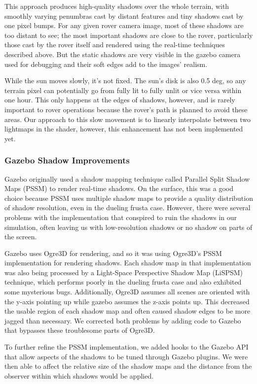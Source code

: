 \documentclass[twocolumn,letterpaper]{IEEEAerospaceCLS}  %
\begin{document}
This approach produces high-quality shadows over the whole terrain, with smoothly varying penumbras cast by distant features and tiny shadows cast by one pixel bumps.  For any given rover camera image, most of these shadows are too distant to see; the most important shadows are close to the rover, particularly those cast by the rover itself and rendered using the real-time techniques described above.  But the static shadows are very visible in the gazebo camera used for debugging and their soft edges add to the images' realism.

While the sun moves slowly, it's not fixed.  The sun's disk is also 0.5 deg, so any terrain pixel can potentially go from fully lit to fully unlit or vice versa within one hour.  This only happens at the edges of shadows, however, and is rarely important to rover operations because the rover's path is planned to avoid these areas.  Our approach to this slow movement is to linearly interpolate between two lightmaps in the shader, however, this enhancement has not been implemented yet.

\subsubsection{Gazebo Shadow Improvements}
Gazebo originally used a shadow mapping technique called Parallel Split Shadow Maps (PSSM) to render real-time shadows. On the surface, this was a good choice because PSSM uses multiple shadow maps to provide a quality distribution of shadow resolution, even in the dueling frusta case. However, there were several problems with the implementation that conspired to ruin the shadows in our simulation, often leaving us with low-resolution shadows or no shadow on parts of the screen.

Gazebo uses Ogre3D for rendering, and so it was using Ogre3D's PSSM implementation for rendering shadows. Each shadow map in that implementation was also being processed by a Light-Space Perspective Shadow Map (LiSPSM) technique, which performs poorly in the dueling frusta case and also exhibited some mysterious bugs. Additionally, Ogre3D assumes all scenes are oriented with the y-axis pointing up while gazebo assumes the z-axis points up. This decreased the usable region of each shadow map and often caused shadow edges to be more jagged than necessary. We corrected both problems by adding code to Gazebo that bypasses these troublesome parts of Ogre3D.

To further refine the PSSM implementation, we added hooks to the Gazebo API that allow aspects of the shadows to be tuned through Gazebo plugins. We were then able to affect the relative size of the shadow maps and the distance from the observer within which shadows would be applied.
\end{document}
